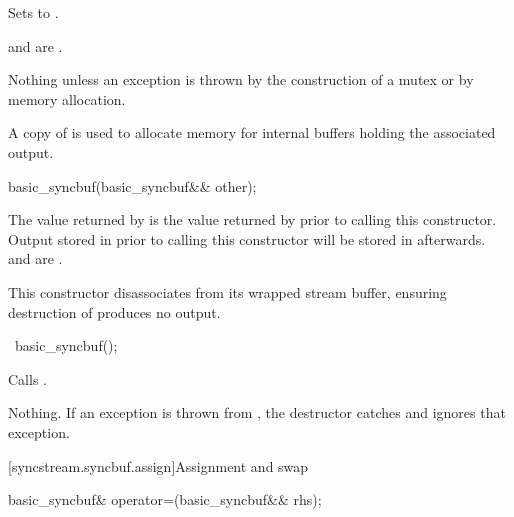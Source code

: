 \begin{itemdescr}
\pnum
\effects
Sets  to .

\pnum
\ensures
{} and
 are .

\pnum
\throws
Nothing unless an exception is thrown
by the construction of a mutex or
by memory allocation.

\pnum
\remarks
A copy of  is used
to allocate memory for internal buffers
holding the associated output.
\end{itemdescr}

%
\begin{itemdecl}
basic_syncbuf(basic_syncbuf&& other);
\end{itemdecl}

\begin{itemdescr}
\pnum
\ensures
The value returned by 
is the value returned by 
prior to calling this constructor.
Output stored in 
prior to calling this constructor
will be stored in  afterwards.
and
are .

\pnum
\remarks
This constructor disassociates 
from its wrapped stream buffer,
ensuring destruction of  produces no output.
\end{itemdescr}

%
\begin{itemdecl}
~basic_syncbuf();
\end{itemdecl}

\begin{itemdescr}
\pnum
\effects
Calls .

\pnum
\throws
Nothing.
If an exception is thrown from ,
the destructor catches and ignores that exception.
\end{itemdescr}

[syncstream.syncbuf.assign]{Assignment and swap}

%
\begin{itemdecl}
basic_syncbuf& operator=(basic_syncbuf&& rhs);
\end{itemdecl}


